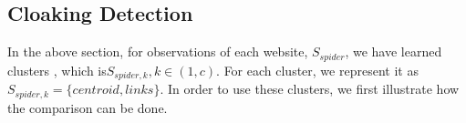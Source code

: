 %





%
%
%


%

\subsection{Cloaking Detection}
In the above section, for observations of each website, $S_{spider}$, we have 
learned clusters , which is$S_{spider, k}, k \in (1, c)$. For each cluster, we
represent it as $S_{spider, k} = \{centroid, links\}$.
In order to use these clusters, we first illustrate how the comparison can be
done.

